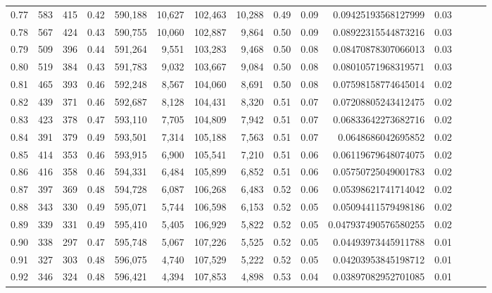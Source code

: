 \begin{tabular}{rrrrrrrrrrrrrrr}
0.77 &     583 &    415 &  0.42 &  590,188 &   10,627 &  102,463 &   10,288 &  0.49 &  0.09 &   0.09425193568127999 &      0.03 \\
0.78 &     567 &    424 &  0.43 &  590,755 &   10,060 &  102,887 &    9,864 &  0.50 &  0.09 &   0.08922315544873216 &      0.03 \\
0.79 &     509 &    396 &  0.44 &  591,264 &    9,551 &  103,283 &    9,468 &  0.50 &  0.08 &   0.08470878307066013 &      0.03 \\
0.80 &     519 &    384 &  0.43 &  591,783 &    9,032 &  103,667 &    9,084 &  0.50 &  0.08 &   0.08010571968319571 &      0.03 \\
0.81 &     465 &    393 &  0.46 &  592,248 &    8,567 &  104,060 &    8,691 &  0.50 &  0.08 &   0.07598158774645014 &      0.02 \\
0.82 &     439 &    371 &  0.46 &  592,687 &    8,128 &  104,431 &    8,320 &  0.51 &  0.07 &   0.07208805243412475 &      0.02 \\
0.83 &     423 &    378 &  0.47 &  593,110 &    7,705 &  104,809 &    7,942 &  0.51 &  0.07 &   0.06833642273682716 &      0.02 \\
0.84 &     391 &    379 &  0.49 &  593,501 &    7,314 &  105,188 &    7,563 &  0.51 &  0.07 &    0.0648686042695852 &      0.02 \\
0.85 &     414 &    353 &  0.46 &  593,915 &    6,900 &  105,541 &    7,210 &  0.51 &  0.06 &   0.06119679648074075 &      0.02 \\
0.86 &     416 &    358 &  0.46 &  594,331 &    6,484 &  105,899 &    6,852 &  0.51 &  0.06 &   0.05750725049001783 &      0.02 \\
0.87 &     397 &    369 &  0.48 &  594,728 &    6,087 &  106,268 &    6,483 &  0.52 &  0.06 &   0.05398621741714042 &      0.02 \\
0.88 &     343 &    330 &  0.49 &  595,071 &    5,744 &  106,598 &    6,153 &  0.52 &  0.05 &   0.05094411579498186 &      0.02 \\
0.89 &     339 &    331 &  0.49 &  595,410 &    5,405 &  106,929 &    5,822 &  0.52 &  0.05 &  0.047937490576580255 &      0.02 \\
0.90 &     338 &    297 &  0.47 &  595,748 &    5,067 &  107,226 &    5,525 &  0.52 &  0.05 &   0.04493973445911788 &      0.01 \\
0.91 &     327 &    303 &  0.48 &  596,075 &    4,740 &  107,529 &    5,222 &  0.52 &  0.05 &   0.04203953845198712 &      0.01 \\
0.92 &     346 &    324 &  0.48 &  596,421 &    4,394 &  107,853 &    4,898 &  0.53 &  0.04 &   0.03897082952701085 &      0.01 \\

\end{tabular}
